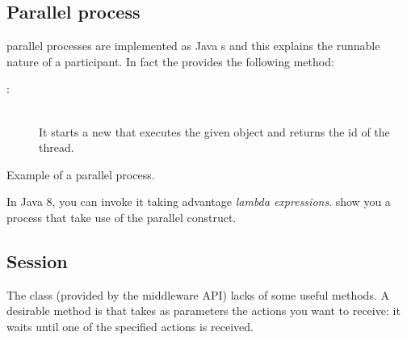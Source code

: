 \subsection{Parallel process}
\coco parallel processes are implemented as Java s and this explains the runnable nature of a participant. In fact the  provides the following method:
%
\begin{description}
	\item[ : ] \hfill \\
	It starts a new  that executes the given  object and returns the id of the thread.
\end{description}
%

\begin{listing}
	\caption{Example of a parallel process.}
	\label{lst:process-parallel}
\end{listing}


In Java 8, you can invoke it taking advantage \textit{lambda expressions}.  show you a process that take use of the parallel construct.


\subsection{Session}

The class  %
(provided by the middleware API) lacks of some useful methods. A desirable method is  that takes as parameters the actions you want to receive: it waits until one of the specified actions is received.

